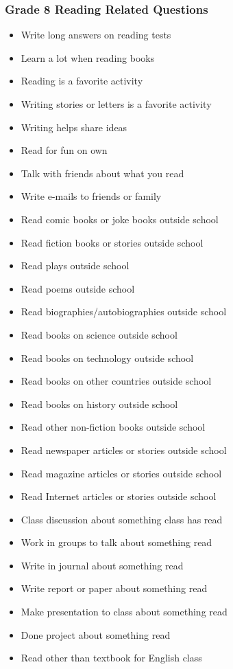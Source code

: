 \documentclass[letterpaper,12pt]{article}
\begin{document}
\begin{singlespace}
\subsubsection{Grade 8 Reading Related Questions}
\begin{itemize}
	\item Write long answers on reading tests
	\item Learn a lot when reading books
	\item Reading is a favorite activity
	\item Writing stories or letters is a favorite activity
	\item Writing helps share ideas
	\item Read for fun on own
	\item Talk with friends about what you read
	\item Write e-mails to friends or family
	\item Read comic books or joke books outside school
	\item Read fiction books or stories outside school
	\item Read plays outside school
	\item Read poems outside school
	\item Read biographies/autobiographies outside school
	\item Read books on science outside school
	\item Read books on technology outside school
	\item Read books on other countries outside school
	\item Read books on history outside school
	\item Read other non-fiction books outside school
	\item Read newspaper articles or stories outside school
	\item Read magazine articles or stories outside school
	\item Read Internet articles or stories outside school
	\item Class discussion about something class has read
	\item Work in groups to talk about something read
	\item Write in journal about something read
	\item Write report or paper about something read
	\item Make presentation to class about something read
	\item Done project about something read
	\item Read other than textbook for English class

\end{itemize}
\end{singlespace}
\end{document}
